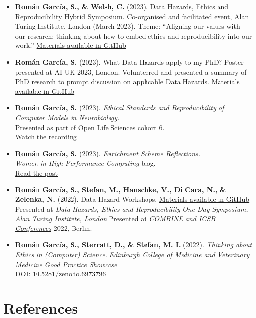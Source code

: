 \documentclass[
  11pt,
  letterpaper,
]{scrreprt}
\begin{document}
\begin{itemize}
\item
  \textbf{Román García, S., \& Welsh, C.} (2023). Data Hazards, Ethics
  and Reproducibility Hybrid Symposium. Co-organised and facilitated
  event, Alan Turing Institute, London (March 2023). Theme: ``Aligning
  our values with our research: thinking about how to embed ethics and
  reproducibility into our work.''
  \href{https://github.com/Susana465/der_symposium_20230310}{Materials
  available in GitHub}
\item
  \textbf{Román García, S.} (2023). What Data Hazards apply to my PhD?
  Poster presented at AI UK 2023, London. Volunteered and presented a
  summary of PhD research to prompt discussion on applicable Data
  Hazards.
  \href{https://github.com/Susana465/DH_Project_CaseStudy}{Materials
  available in GitHub}
\item
  \textbf{Román García, S.} (2023). \emph{Ethical Standards and
  Reproducibility of Computer Models in Neurobiology.}\\
  Presented as part of Open Life Sciences cohort 6.\\
  \href{https://www.youtube.com/watch?v=3qb28JDFhGw}{Watch the
  recording}
\item
  \textbf{Román García, S.} (2023). \emph{Enrichment Scheme
  Reflections.}\\
  \emph{Women in High Performance Computing} blog.\\
  \href{https://womeninhpc.org/paths-to-hpc/enrichment-scheme-reflections-the-alan-turing-institute}{Read
  the post}
\item
  \textbf{Román García, S., Stefan, M., Hanschke, V., Di Cara, N., \&
  Zelenka, N.} (2022). Data Hazard Workshops.
  \href{https://github.com/Susana465/Data_Hazards_workshops}{Materials
  available in GitHub} Presented at \emph{Data Hazards, Ethics and
  Reproducibility One-Day Symposium, Alan Turing Institute, London}
  Presented at \emph{\href{https://co.mbine.org/events/}{COMBINE and
  ICSB Conferences}} 2022, Berlin.
\item
  \textbf{Román García, S., Sterratt, D., \& Stefan, M. I.} (2022).
  \emph{Thinking about Ethics in (Computer) Science.} \emph{Edinburgh
  College of Medicine and Veterinary Medicine Good Practice Showcase}\\
  DOI:
  \href{https://doi.org/10.5281/zenodo.6973796}{10.5281/zenodo.6973796}
\end{itemize}


\chapter*{References}\label{references}
\end{document}
